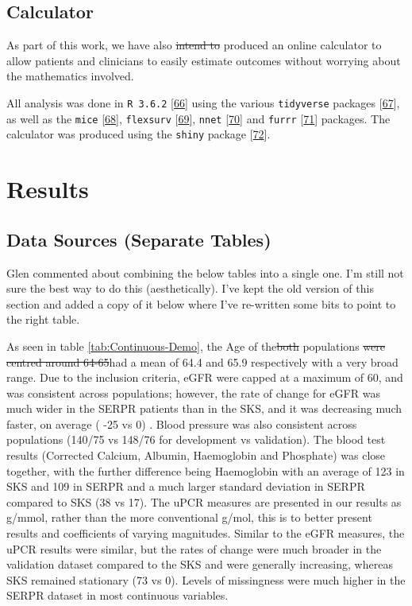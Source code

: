 \documentclass[
]{article}
\begin{document}
\hypertarget{calculator}{%
\subsection{Calculator}\label{calculator}}

As part of this work, we have also \sout{intend to} produced an online calculator to allow patients and clinicians to easily estimate outcomes without worrying about the mathematics involved.

All analysis was done in \texttt{R\ 3.6.2} {[}\protect\hyperlink{ref-r_core_team_r_nodate}{66}{]} using the various \texttt{tidyverse} packages {[}\protect\hyperlink{ref-wickham_tidy_2017}{67}{]}, as well as the \texttt{mice} {[}\protect\hyperlink{ref-buuren_mice_2011-1}{68}{]}, \texttt{flexsurv} {[}\protect\hyperlink{ref-jackson_flexsurv_nodate}{69}{]}, \texttt{nnet} {[}\protect\hyperlink{ref-ripley_package_2016}{70}{]} and \texttt{furrr} {[}\protect\hyperlink{ref-vaughan_furrr_2018}{71}{]} packages. The calculator was produced using the \texttt{shiny} package {[}\protect\hyperlink{ref-chang_shiny_2020}{72}{]}.

\hypertarget{results-1}{%
\section{Results}\label{results-1}}

\hypertarget{data-sources-separate-tables}{%
\subsection{Data Sources (Separate Tables)}\label{data-sources-separate-tables}}

Glen commented about combining the below tables into a single one. I'm still not sure the best way to do this (aesthetically). I've kept the old version of this section and added a copy of it below where I've re-written some bits to point to the right table.

As seen in table \ref{tab:Continuous-Demo}, the Age of the\sout{both} populations \sout{were centred around 64-65}had a mean of 64.4 and 65.9 respectively with a very broad range. Due to the inclusion criteria, eGFR were capped at a maximum of 60, and was consistent across populations; however, the rate of change for eGFR was much wider in the SERPR patients than in the SKS, and it was decreasing much faster, on average ( -25 vs 0) . Blood pressure was also consistent across populations (140/75 vs 148/76 for development vs validation). The blood test results (Corrected Calcium, Albumin, Haemoglobin and Phosphate) was close together, with the further difference being Haemoglobin with an average of 123 in SKS and 109 in SERPR and a much larger standard deviation in SERPR compared to SKS (38 vs 17). The uPCR measures are presented in our results as g/mmol, rather than the more conventional g/mol, this is to better present results and coefficients of varying magnitudes. Similar to the eGFR measures, the uPCR results were similar, but the rates of change were much broader in the validation dataset compared to the SKS and were generally increasing, whereas SKS remained stationary (73 vs 0). Levels of missingness were much higher in the SERPR dataset in most continuous variables.
\end{document}
